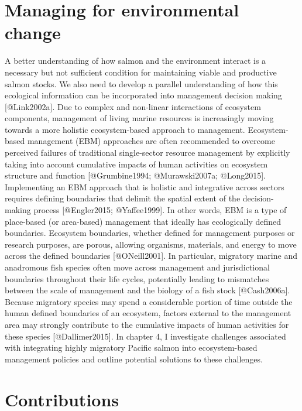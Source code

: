 \section{Managing for environmental
change}\label{managing-for-environmental-change}

A better understanding of how salmon and the environment interact is a
necessary but not sufficient condition for maintaining viable and
productive salmon stocks. We also need to develop a parallel
understanding of how this ecological information can be incorporated
into management decision making {[}@Link2002a{]}. Due to complex and
non-linear interactions of ecosystem components, management of living
marine resources is increasingly moving towards a more holistic
ecosystem-based approach to management. Ecosystem-based management (EBM)
approaches are often recommended to overcome perceived failures of
traditional single-sector resource management by explicitly taking into
account cumulative impacts of human activities on ecosystem structure
and function {[}@Grumbine1994; @Murawski2007a; @Long2015{]}.
Implementing an EBM approach that is holistic and integrative across
sectors requires defining boundaries that delimit the spatial extent of
the decision-making process {[}@Engler2015; @Yaffee1999{]}. In other
words, EBM is a type of place-based (or area-based) management that
ideally has ecologically defined boundaries. Ecosystem boundaries,
whether defined for management purposes or research purposes, are
porous, allowing organisms, materials, and energy to move across the
defined boundaries {[}@ONeill2001{]}. In particular, migratory marine
and anadromous fish species often move across management and
jurisdictional boundaries throughout their life cycles, potentially
leading to mismatches between the scale of management and the biology of
a fish stock {[}@Cash2006a{]}. Because migratory species may spend a
considerable portion of time outside the human defined boundaries of an
ecosystem, factors external to the management area may strongly
contribute to the cumulative impacts of human activities for these
species {[}@Dallimer2015{]}. In chapter 4, I investigate challenges
associated with integrating highly migratory Pacific salmon into
ecosystem-based management policies and outline potential solutions to
these challenges.

\section{Contributions}\label{contributions}

